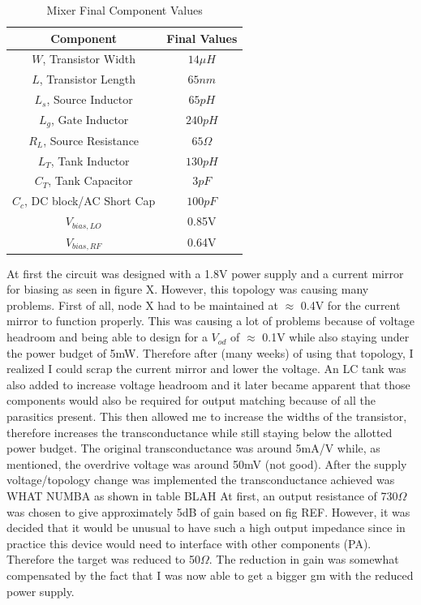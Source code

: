 \documentclass{article}                                                         %
\begin{document}
\begin{table}[H]
\centering
 \begin{tabular}{ | c | c |}
   \hline
    \textbf{Component} & \textbf{Final Values}   \\
    \hline
    \hline
    $W$, Transistor Width & $14 \mu H$ \\
    \hline
    $L$, Transistor Length & $65nm$ \\
    \hline
    $L_s$, Source Inductor & $65pH$ \\
    \hline
    $L_g$, Gate Inductor & $240pH$ \\
    \hline
    $R_L$, Source Resistance & $65\Omega$ \\
    \hline
    $L_T$, Tank Inductor & $130pH$ \\
    \hline
    $C_T$, Tank Capacitor & $3pF$ \\
    \hline
    $C_c$, DC block/AC Short Cap & $100pF$ \\
    \hline
    $V_{bias,LO}$ & 0.85V \\
    \hline
    $V_{bias,RF}$ & 0.64V \\
    \hline
  \end{tabular}
  \caption{Mixer Final Component Values}
  \label{table:finalvals}
\end{table}

At first the circuit was designed with a 1.8V power supply and a current mirror for biasing
as seen in figure X. However, this topology was causing many problems. First of all, node X
had to be maintained at $\approx$ 0.4V for the current mirror to function properly. This was
causing a lot of problems because of voltage headroom and being able to design for a $V_{od}$
of $\approx$ 0.1V while also staying under the power budget of 5mW. Therefore after (many weeks)
of using that topology, I realized I could scrap the current mirror and lower the voltage. An LC
tank was also added to increase voltage headroom and it later became apparent that those components would
also be required for output matching because of all the parasitics present.
This then allowed me to increase the widths of the transistor, therefore increases the transconductance
while still staying below the allotted power budget. The original transconductance was around 5mA/V while,
as mentioned, the overdrive voltage was around 50mV (not good). After the supply voltage/topology change
was implemented the transconductance achieved was WHAT NUMBA as shown in table BLAH
At first, an output resistance of 730$\Omega$
was chosen to give approximately 5dB of gain based on fig REF. However, it was decided that it would
be unusual to have such a high output impedance since in practice this device would need to interface
with other components (PA). Therefore the target was reduced to 50$\Omega$. The reduction in gain was
somewhat compensated by the fact that I was now able to get a bigger gm with the reduced power supply.
\end{document}
